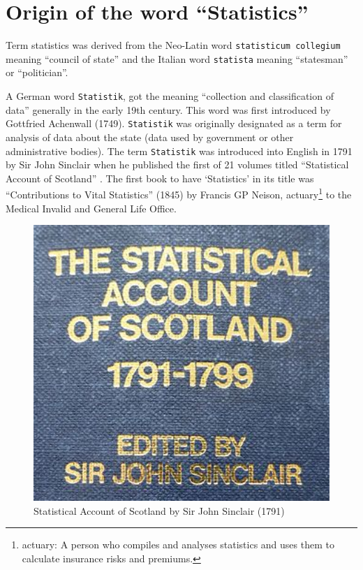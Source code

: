 \documentclass[
]{book}
\begin{document}
\section{Origin of the word ``Statistics''}\label{origin-of-the-word-statistics}

Term statistics was derived from the Neo-Latin word
\texttt{statisticum\ collegium} meaning ``council of state'' and the Italian word
\texttt{statista} meaning ``statesman'' or ``politician''.

A German word \texttt{Statistik}, got the meaning ``collection and
classification of data'' generally in the early 19th century. This word
was first introduced by Gottfried Achenwall (1749). \texttt{Statistik} was
originally designated as a term for analysis of data about the state
(data used by government or other administrative bodies). The term
\texttt{Statistik} was introduced into English in 1791 by Sir John Sinclair
when he published the first of 21 volumes titled ``Statistical Account of
Scotland'' \citep{ball}. The first book to have `Statistics' in its title was
``Contributions to Vital Statistics'' (1845) by Francis GP Neison,
actuary\footnote{actuary: A person who compiles and analyses
  statistics and uses them to calculate insurance risks and premiums.} to the Medical Invalid and General Life Office.

\begin{figure}

{\centering \includegraphics[width=4.44in]{images/history1} 

}

\caption{Statistical Account of Scotland by Sir John Sinclair (1791)}\label{fig:scotland}
\end{figure}
\end{document}
